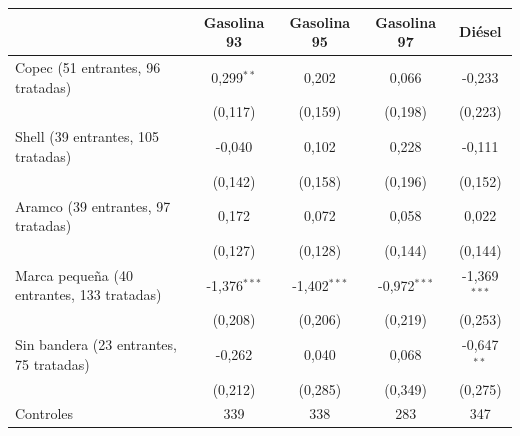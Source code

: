 \begin{tabular}{lcccc}
\toprule
 & Gasolina 93 & Gasolina 95 & Gasolina 97 & Diésel \\
\midrule
Copec (51 entrantes, 96 tratadas) & 0{,}299$^{**}$ & 0{,}202 & 0{,}066 & -0{,}233 \\
 & (0{,}117) & (0{,}159) & (0{,}198) & (0{,}223) \\
Shell (39 entrantes, 105 tratadas) & -0{,}040 & 0{,}102 & 0{,}228 & -0{,}111 \\
 & (0{,}142) & (0{,}158) & (0{,}196) & (0{,}152) \\
Aramco (39 entrantes, 97 tratadas) & 0{,}172 & 0{,}072 & 0{,}058 & 0{,}022 \\
 & (0{,}127) & (0{,}128) & (0{,}144) & (0{,}144) \\
Marca pequeña (40 entrantes, 133 tratadas) & -1{,}376$^{***}$ & -1{,}402$^{***}$ & -0{,}972$^{***}$ & -1{,}369$^{***}$ \\
 & (0{,}208) & (0{,}206) & (0{,}219) & (0{,}253) \\
Sin bandera (23 entrantes, 75 tratadas) & -0{,}262 & 0{,}040 & 0{,}068 & -0{,}647$^{**}$ \\
 & (0{,}212) & (0{,}285) & (0{,}349) & (0{,}275) \\
\midrule
Controles & 339 & 338 & 283 & 347 \\
\bottomrule
\end{tabular}
